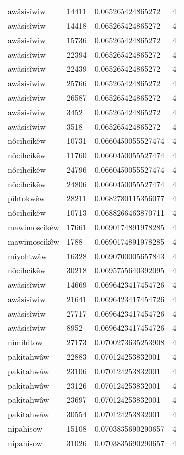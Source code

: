 \begin{longtable}{llll}
awâsisîwiw & 14411 & 0.065265424865272 & 4 \\
awâsisîwiw & 14418 & 0.065265424865272 & 4 \\
awâsisîwiw & 15736 & 0.065265424865272 & 4 \\
awâsisîwiw & 22394 & 0.065265424865272 & 4 \\
awâsisîwiw & 22439 & 0.065265424865272 & 4 \\
awâsisîwiw & 25766 & 0.065265424865272 & 4 \\
awâsisîwiw & 26587 & 0.065265424865272 & 4 \\
awâsisîwiw & 3452 & 0.065265424865272 & 4 \\
awâsisîwiw & 3518 & 0.065265424865272 & 4 \\
nôcihcikêw & 10731 & 0.0660450055527474 & 4 \\
nôcihcikêw & 11760 & 0.0660450055527474 & 4 \\
nôcihcikêw & 24796 & 0.0660450055527474 & 4 \\
nôcihcikêw & 24806 & 0.0660450055527474 & 4 \\
pîhtokwêw & 28211 & 0.0682780115356077 & 4 \\
nôcihcikêw & 10713 & 0.0688266463870711 & 4 \\
mawimoscikêw & 17661 & 0.0690174891978285 & 4 \\
mawimoscikêw & 1788 & 0.0690174891978285 & 4 \\
miyohtwâw & 16328 & 0.0690700005657843 & 4 \\
nôcihcikêw & 30218 & 0.0695755640392095 & 4 \\
awâsisîwiw & 14669 & 0.0696423417454726 & 4 \\
awâsisîwiw & 21641 & 0.0696423417454726 & 4 \\
awâsisîwiw & 27717 & 0.0696423417454726 & 4 \\
awâsisîwiw & 8952 & 0.0696423417454726 & 4 \\
nîmihitow & 27173 & 0.0700273635253908 & 4 \\
pakitahwâw & 22883 & 0.070124253832001 & 4 \\
pakitahwâw & 23106 & 0.070124253832001 & 4 \\
pakitahwâw & 23126 & 0.070124253832001 & 4 \\
pakitahwâw & 23697 & 0.070124253832001 & 4 \\
pakitahwâw & 30554 & 0.070124253832001 & 4 \\
nipahisow & 15108 & 0.0703835690290657 & 4 \\
nipahisow & 31026 & 0.0703835690290657 & 4 \\

\end{longtable}
